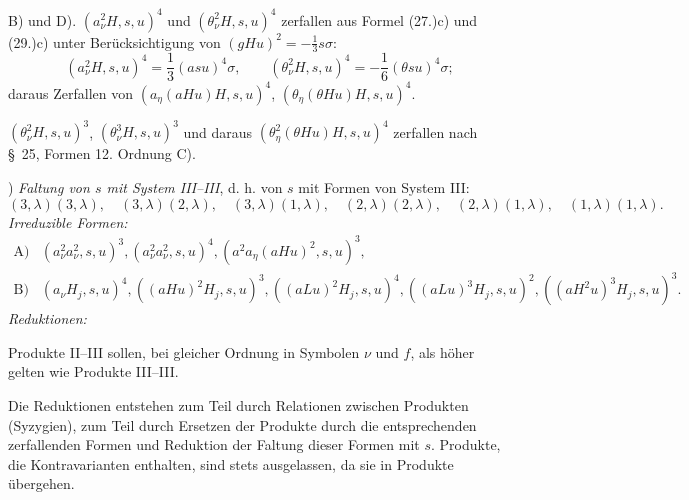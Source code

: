 \documentclass[11pt]{article}
\begin{document}
B) und D). $(a_\nu^2H,s,u)^4$ und $(\theta_\nu^2H,s,u)^4$ zerfallen aus Formel (27.)c) und (29.)c) unter Berücksichtigung von $(gHu)^2=-\frac13s\sigma$:
\[
(a_\nu^2H,s,u)^4=\frac13(asu)^4\sigma,
\qquad
(\theta_\nu^2H,s,u)^4=-\frac16(\theta su)^4\sigma;
\]
daraus Zerfallen von $(a_\eta(aHu)H,s,u)^4$, $(\theta_\eta(\theta Hu)H,s,u)^4$.

$(\theta_\nu^2H,s,u)^3$, $(\theta_\nu^3H,s,u)^3$ und daraus $(\theta_\eta^2(\theta Hu)H,s,u)^4$ zerfallen nach \S\ 25, Formen 12. Ordnung C).

) \emph{Faltung von $s$ mit System III--III}, d. h. von $s$ mit Formen von System III:
\[
(3,\lambda)(3,\lambda),\quad (3,\lambda)(2,\lambda),\quad (3,\lambda)(1,\lambda),\quad
(2,\lambda)(2,\lambda),\quad (2,\lambda)(1,\lambda),\quad (1,\lambda)(1,\lambda).
\]
\noindent\emph{Irreduzible Formen:}
\[
\begin{array}{rl}
\text{A)}&(a_\nu^2a_\nu^2,s,u)^3,
(a_\nu^2a_\nu^2,s,u)^4,
(a^2a_\eta(aHu)^2,s,u)^3,\\[0.3em]
\text{B)}&(a_\nu H_j,s,u)^4,
((aHu)^2H_j,s,u)^3,
((aLu)^2H_j,s,u)^4,
((aLu)^3H_j,s,u)^2,
((aH^2u)^3H_j,s,u)^3.
\end{array}
\]
\noindent\emph{Reduktionen:}

Produkte II--III sollen, bei gleicher Ordnung in Symbolen $\nu$ und $f$, als höher gelten wie Produkte III--III.

Die Reduktionen entstehen zum Teil durch Relationen zwischen Produkten (Syzygien), zum Teil durch Ersetzen der Produkte durch die entsprechenden zerfallenden Formen und Reduktion der Faltung dieser Formen mit $s$. Produkte, die Kontravarianten enthalten, sind stets ausgelassen, da sie in Produkte übergehen.
\end{document}

